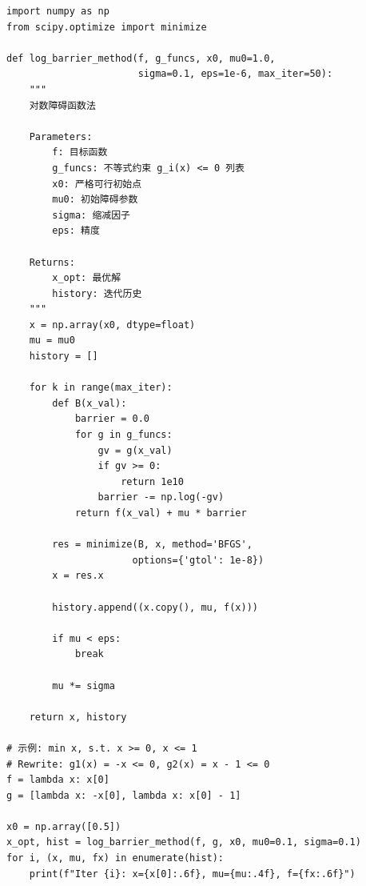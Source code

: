 \begin{codebox}[对数障碍法]
\begin{lstlisting}
import numpy as np
from scipy.optimize import minimize

def log_barrier_method(f, g_funcs, x0, mu0=1.0,
                       sigma=0.1, eps=1e-6, max_iter=50):
    """
    对数障碍函数法
    
    Parameters:
        f: 目标函数
        g_funcs: 不等式约束 g_i(x) <= 0 列表
        x0: 严格可行初始点
        mu0: 初始障碍参数
        sigma: 缩减因子
        eps: 精度
    
    Returns:
        x_opt: 最优解
        history: 迭代历史
    """
    x = np.array(x0, dtype=float)
    mu = mu0
    history = []
    
    for k in range(max_iter):
        def B(x_val):
            barrier = 0.0
            for g in g_funcs:
                gv = g(x_val)
                if gv >= 0:
                    return 1e10
                barrier -= np.log(-gv)
            return f(x_val) + mu * barrier
        
        res = minimize(B, x, method='BFGS',
                      options={'gtol': 1e-8})
        x = res.x
        
        history.append((x.copy(), mu, f(x)))
        
        if mu < eps:
            break
        
        mu *= sigma
    
    return x, history

# 示例: min x, s.t. x >= 0, x <= 1
# Rewrite: g1(x) = -x <= 0, g2(x) = x - 1 <= 0
f = lambda x: x[0]
g = [lambda x: -x[0], lambda x: x[0] - 1]

x0 = np.array([0.5])
x_opt, hist = log_barrier_method(f, g, x0, mu0=0.1, sigma=0.1)
for i, (x, mu, fx) in enumerate(hist):
    print(f"Iter {i}: x={x[0]:.6f}, mu={mu:.4f}, f={fx:.6f}")
\end{lstlisting}
\end{codebox}

